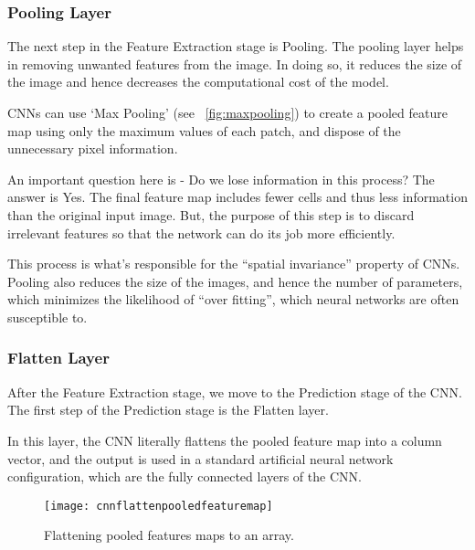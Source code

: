 	\subsubsection{Pooling Layer}
	\begin{bulletedlist}
		\item The next step in the Feature Extraction stage is Pooling.  The pooling layer helps in removing unwanted features from the image.  In doing so, it reduces the size of the image and hence decreases the computational cost of the model.
		\item CNNs can use `Max Pooling' (see \figurename~\ref{fig:maxpooling}) to create a pooled feature map using only the maximum values of each patch, and dispose of the unnecessary pixel information.
		\item An important question here is - Do we lose information in this process?  The answer is Yes.  The final feature map includes fewer cells and thus less information than the original input image.  But, the purpose of this step is to discard irrelevant features so that the network can do its job more efficiently.
		\item This process is what's responsible for the ``spatial invariance'' property of CNNs.  Pooling also reduces the size of the images, and hence the number of parameters, which minimizes the likelihood of ``over fitting'', which neural networks are often susceptible to.
	\end{bulletedlist}


	\subsubsection{Flatten Layer}
	\begin{bulletedlist}
		\item After the Feature Extraction stage, we move to the Prediction stage of the CNN.  The first step of the Prediction stage is the Flatten layer.
		\item In this layer, the CNN literally flattens the pooled feature map into a column vector, and the output is used in a standard artificial neural network configuration, which are the fully connected layers of the CNN.
	\end{bulletedlist}

	\begin{figure}[tbh]
		\centering
		\texttt{[image: cnnflattenpooledfeaturemap]}
		\caption[Flattening pooled features maps to an array]{Flattening pooled features maps to an array.}
		\label{fig:cnnflattenpooledfeaturemap}
	\end{figure}


